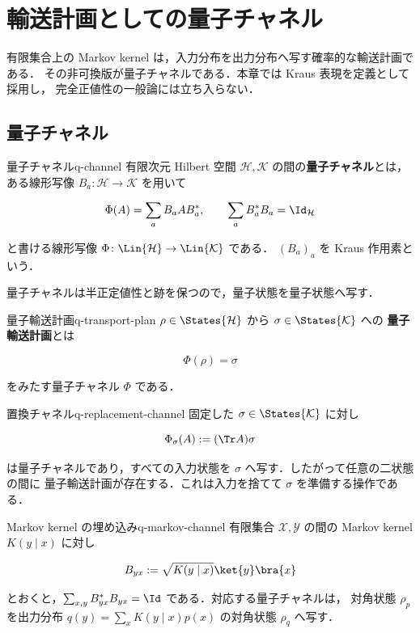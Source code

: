 \chapter{輸送計画としての量子チャネル}
\label{ch:quantum-channels}

有限集合上の Markov kernel は，入力分布を出力分布へ写す確率的な輸送計画である．
その非可換版が量子チャネルである．本章では Kraus 表現を定義として採用し，
完全正値性の一般論には立ち入らない．

\section{量子チャネル}

\begin{definition}{量子チャネル}{q-channel}
  有限次元 Hilbert 空間 $\mathcal{H},\mathcal{K}$ の間の\textbf{量子チャネル}とは，
  ある線形写像 $B_a\colon\mathcal{H}\to\mathcal{K}$ を用いて

  \[
    \Phi(A)=\sum_aB_aAB_a^*,
    \qquad
    \sum_aB_a^*B_a=\Id_{\mathcal{H}}
  \]

  と書ける線形写像 $\Phi\colon\Lin{\mathcal{H}}\to\Lin{\mathcal{K}}$ である．
  $(B_a)_a$ を Kraus 作用素という．
\end{definition}

量子チャネルは半正定値性と跡を保つので，量子状態を量子状態へ写す．

\begin{definition}{量子輸送計画}{q-transport-plan}
  $\rho\in\States{\mathcal{H}}$ から $\sigma\in\States{\mathcal{K}}$ への
  \textbf{量子輸送計画}とは

  \[
    \Phi(\rho)=\sigma
  \]

  をみたす量子チャネル $\Phi$ である．
\end{definition}

\begin{example}{置換チャネル}{q-replacement-channel}
  固定した $\sigma\in\States{\mathcal{K}}$ に対し

  \[
    \Phi_\sigma(A):=(\Tr A)\sigma
  \]

  は量子チャネルであり，すべての入力状態を $\sigma$ へ写す．したがって任意の二状態の間に
  量子輸送計画が存在する．これは入力を捨てて $\sigma$ を準備する操作である．
\end{example}

\begin{example}{Markov kernel の埋め込み}{q-markov-channel}
  有限集合 $\mathcal{X},\mathcal{Y}$ の間の Markov kernel $K(y\mid x)$ に対し

  \[
    B_{yx}:=\sqrt{K(y\mid x)}\ket{y}\bra{x}
  \]

  とおくと，$\sum_{x,y}B_{yx}^*B_{yx}=\Id$ である．対応する量子チャネルは，
  対角状態 $\rho_p$ を出力分布
  $q(y)=\sum_xK(y\mid x)p(x)$ の対角状態 $\rho_q$ へ写す．
\end{example}


